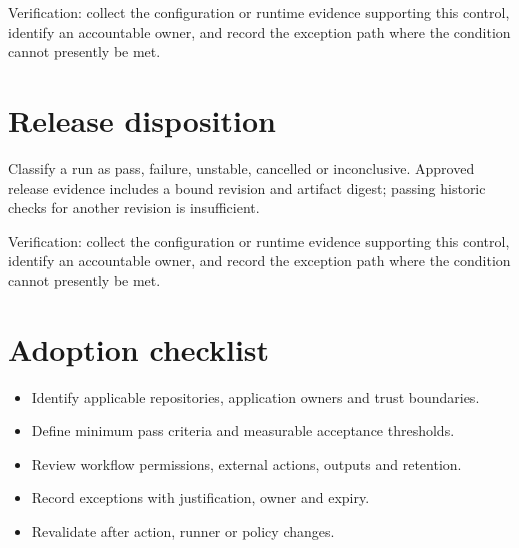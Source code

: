 \documentclass[11pt,letterpaper]{article}
\begin{document}
Verification: collect the configuration or runtime evidence supporting this control, identify an accountable owner, and record the exception path where the condition cannot presently be met.

\section{Release disposition}
Classify a run as pass, failure, unstable, cancelled or inconclusive. Approved release evidence includes a bound revision and artifact digest; passing historic checks for another revision is insufficient.

Verification: collect the configuration or runtime evidence supporting this control, identify an accountable owner, and record the exception path where the condition cannot presently be met.

\section{Adoption checklist}
\begin{itemize}
\item Identify applicable repositories, application owners and trust boundaries.
\item Define minimum pass criteria and measurable acceptance thresholds.
\item Review workflow permissions, external actions, outputs and retention.
\item Record exceptions with justification, owner and expiry.
\item Revalidate after action, runner or policy changes.
\end{itemize}
\end{document}
